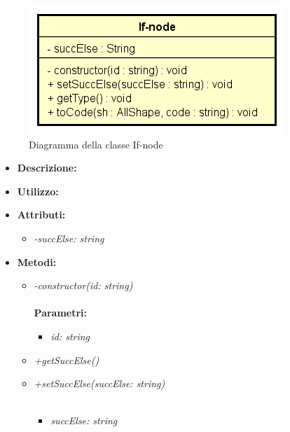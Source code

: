 \begin{figure}[h!]
	\centering
	\includegraphics[scale=0.8]{res/sections/SpecificaFrontEnd/Services/Disegnetti/if-node.png}
	\caption{Diagramma della classe If-node}
\end{figure}

\begin{itemize}
	\item \textbf{Descrizione:}\\
	
	\item \textbf{Utilizzo:}\\
	
	\item \textbf{Attributi:}
		\begin{itemize}
			\item \emph{-succElse: string}\\
			
		\end{itemize}
	\item \textbf{Metodi:}
		\begin{itemize}
			\item \emph{-constructor(id: string)}\\
    		\\
    		\textbf{Parametri:}
    		\begin{itemize}
    			\item \emph{id: string}\\
    			
    		\end{itemize}
    		\item \emph{+getSuccElse()}\\
    		
    		\item \emph{+setSuccElse(succElse: string)}\\
    		\\
    		\begin{itemize}
    			\item \emph{succElse: string}\\
    			

\end{itemize}
\end{itemize}
\end{itemize}
